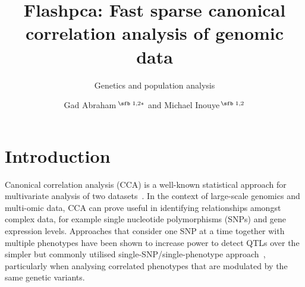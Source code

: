 \documentclass{bioinfo}
\begin{document}

\subtitle{Genetics and population analysis}

\title[Fast SCCA]{Flashpca: Fast sparse canonical correlation analysis of genomic data}
\author[Sample \textit{et~al}.]{Gad Abraham\,$^{\text{\sfb 1,2}*}$
and Michael Inouye\,$^{\text{\sfb 1,2}}$}
\address{$^{\text{\sf 1}}$ Centre for Systems Genomics, School of
BioSciences, University of Melbourne, Parkville 3010, VIC, Australia. \\
$^{\text{\sf 2}}$ Department of Pathology, Faculty of Medicine, Dentistry, and
Health Sciences, University of Melbourne,\\ Parkville 3010, VIC, Australia.}





\maketitle

\section{Introduction}

Canonical correlation analysis (CCA) is a well-known statistical approach for
multivariate analysis of two datasets~\citep{Hotelling1936}. In the context of
large-scale genomics and multi-omic data, CCA can prove useful in identifying
relationships amongst complex data, for example single nucleotide polymorphisms
(SNPs) and gene expression levels. Approaches that consider one SNP at a time
together with multiple phenotypes have been shown to increase power to detect
QTLs over the simpler but commonly utilised single-SNP/single-phenotype
approach~\citep{Ferreira2009,Inouye2012}, particularly when analysing
correlated phenotypes that are modulated by the same genetic variants.
\end{document}
